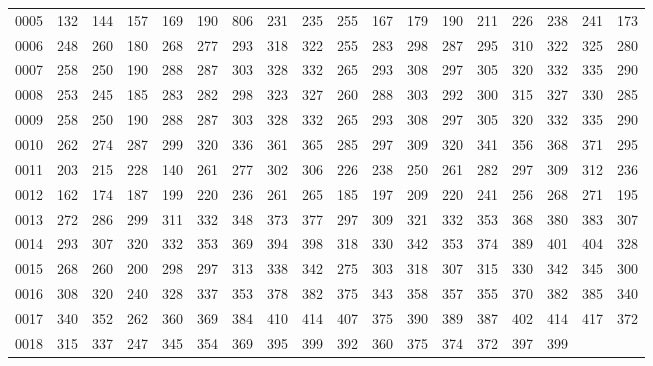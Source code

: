 \begin{table}[htbp]
\begin{center}
{\begin{tabular}{lccccccccccccccccc}
0005 & 132 & 144 & 157 & 169 & 190 & 806 & 231 & 235 & 255 & 167 & 179 &
						   190 & 211 & 226 & 238
							       & 241 &
								       173 \\
0006 & 248 & 260 & 180 & 268 & 277 & 293 & 318 & 322 & 255 & 283 & 298 &
						   287 & 295 & 310 & 322
							       & 325 &
								       280 \\
0007 & 258 & 250 & 190 & 288 & 287 & 303 & 328 & 332 & 265 & 293 & 308 &
						   297 & 305 & 320 & 332
							       & 335 &
								       290 \\
0008 & 253 & 245 & 185 & 283 & 282 & 298 & 323 & 327 & 260 & 288 & 303 &
						   292 & 300 & 315 & 327
							       & 330 &
								       285 \\
0009 & 258 & 250 & 190 & 288 & 287 & 303 & 328 & 332 & 265 & 293 & 308 &
						   297 & 305 & 320 & 332
							       & 335 &
								       290 \\
0010 & 262 & 274 & 287 & 299 & 320 & 336 & 361 & 365 & 285 & 297 & 309 &
						   320 & 341 & 356 & 368
							       & 371 &
								       295 \\
0011 & 203 & 215 & 228 & 140 & 261 & 277 & 302 & 306 & 226 & 238 & 250 &
						   261 & 282 & 297 & 309
							       & 312 &
								       236 \\
0012 & 162 & 174 & 187 & 199 & 220 & 236 & 261 & 265 & 185 & 197 & 209 &
						   220 & 241 & 256 & 268
							       & 271 &
								       195 \\
0013 & 272 & 286 & 299 & 311 & 332 & 348 & 373 & 377 & 297 & 309 & 321 &
						   332 & 353 & 368 & 380
							       & 383 &
								       307 \\
0014 & 293 & 307 & 320 & 332 & 353 & 369 & 394 & 398 & 318 & 330 & 342 &
						   353 & 374 & 389 & 401
							       & 404 &
								       328 \\
0015 & 268 & 260 & 200 & 298 & 297 & 313 & 338 & 342 & 275 & 303 & 318 &
						   307 & 315 & 330 & 342
							       & 345 &
								       300 \\
0016 & 308 & 320 & 240 & 328 & 337 & 353 & 378 & 382 & 375 & 343 & 358 &
						   357 & 355 & 370 & 382
							       & 385 &
								       340 \\
0017 & 340 & 352 & 262 & 360 & 369 & 384 & 410 & 414 & 407 & 375 & 390 &
						   389 & 387 & 402 & 414
							       & 417 &
								       372 \\
0018 & 315 & 337 & 247 & 345 & 354 & 369 & 395 & 399 & 392 & 360 & 375 &
						   374 & 372 & 397 & 399


\end{tabular}}
\end{center}
\end{table}
